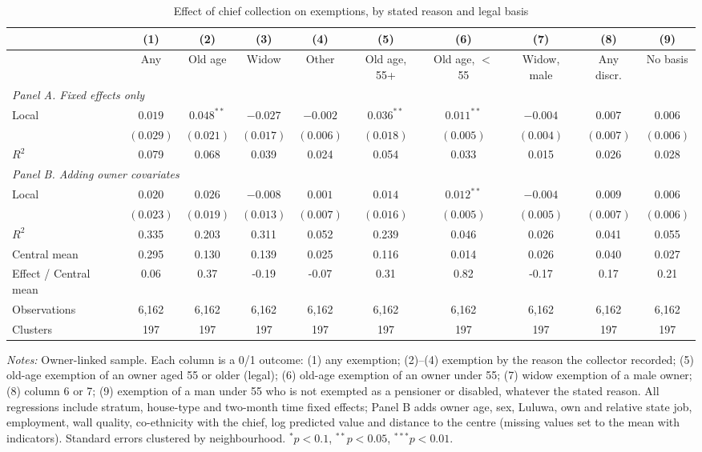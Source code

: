 \begin{table}[!htbp]\centering\scriptsize
\caption{Effect of chief collection on exemptions, by stated reason and legal basis}\label{tab:ate}
\begin{threeparttable}
\begin{tabular}{lccccccccc}
\toprule
 & (1) & (2) & (3) & (4) & (5) & (6) & (7) & (8) & (9) \\
\midrule
 & Any & Old age & Widow & Other & Old age, 55+ & Old age, $<$55 & Widow, male & Any discr. & No basis \\
\midrule
\multicolumn{10}{l}{\textit{Panel A. Fixed effects only}} \\
Local & $0.019$ & $0.048^{**}$ & $-0.027$ & $-0.002$ & $0.036^{**}$ & $0.011^{**}$ & $-0.004$ & $0.007$ & $0.006$ \\
 & $(0.029)$ & $(0.021)$ & $(0.017)$ & $(0.006)$ & $(0.018)$ & $(0.005)$ & $(0.004)$ & $(0.007)$ & $(0.006)$ \\
$R^2$ & 0.079 & 0.068 & 0.039 & 0.024 & 0.054 & 0.033 & 0.015 & 0.026 & 0.028 \\
\midrule
\multicolumn{10}{l}{\textit{Panel B. Adding owner covariates}} \\
Local & $0.020$ & $0.026$ & $-0.008$ & $0.001$ & $0.014$ & $0.012^{**}$ & $-0.004$ & $0.009$ & $0.006$ \\
 & $(0.023)$ & $(0.019)$ & $(0.013)$ & $(0.007)$ & $(0.016)$ & $(0.005)$ & $(0.005)$ & $(0.007)$ & $(0.006)$ \\
$R^2$ & 0.335 & 0.203 & 0.311 & 0.052 & 0.239 & 0.046 & 0.026 & 0.041 & 0.055 \\
\midrule
Central mean & 0.295 & 0.130 & 0.139 & 0.025 & 0.116 & 0.014 & 0.026 & 0.040 & 0.027 \\
Effect / Central mean & 0.06 & 0.37 & -0.19 & -0.07 & 0.31 & 0.82 & -0.17 & 0.17 & 0.21 \\
Observations & 6,162 & 6,162 & 6,162 & 6,162 & 6,162 & 6,162 & 6,162 & 6,162 & 6,162 \\
Clusters & 197 & 197 & 197 & 197 & 197 & 197 & 197 & 197 & 197 \\
\bottomrule
\end{tabular}
\begin{tablenotes}[flushleft]\scriptsize
\item \textit{Notes:} Owner-linked sample. Each column is a 0/1 outcome: (1) any exemption; (2)--(4) exemption by the reason the collector recorded; (5) old-age exemption of an owner aged 55 or older (legal); (6) old-age exemption of an owner under 55; (7) widow exemption of a male owner; (8) column 6 or 7; (9) exemption of a man under 55 who is not exempted as a pensioner or disabled, whatever the stated reason. All regressions include stratum, house-type and two-month time fixed effects; Panel B adds owner age, sex, Luluwa, own and relative state job, employment, wall quality, co-ethnicity with the chief, log predicted value and distance to the centre (missing values set to the mean with indicators). Standard errors clustered by neighbourhood. $^{*}p<0.1$, $^{**}p<0.05$, $^{***}p<0.01$.
\end{tablenotes}
\end{threeparttable}
\end{table}